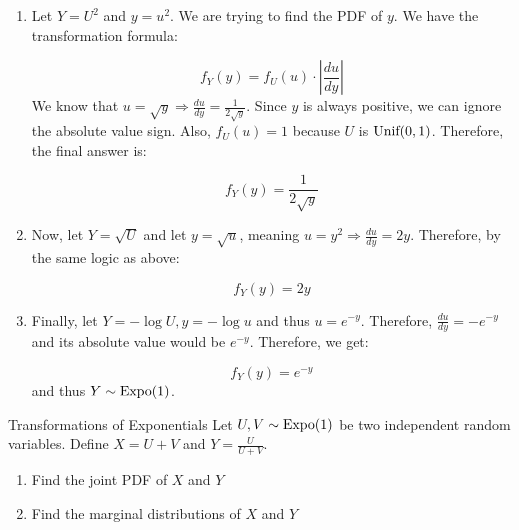 \documentclass[11.5pt]{article}
\begin{document}
\begin{solution}{4}
\begin{enumerate}
\item Let $Y = U^2$ and $y = u^2$. We are trying to find the PDF of $y$. We have the transformation formula: 

$$ f_Y(y) = f_U(u) \cdot \left| \frac{du}{dy}  \right|$$
We know that $u = \sqrt{y} \Rightarrow \frac{du}{dy} = \frac{1}{2 \sqrt{y}}$. Since $y$ is always positive, we can ignore the absolute value sign. Also, $f_U(u) = 1$ because $U$ is $\textrm{Unif}(0,1)$. Therefore, the final answer is: 

$$ f_Y(y) = \frac{1}{2 \sqrt{y}}$$

\item Now, let $Y = \sqrt{U}$ and let $y = \sqrt{u}$, meaning $u= y^2 \Rightarrow \frac{du}{dy} = 2y$. Therefore, by the same logic as above: 

$$ f_Y(y) = 2y$$

\item Finally, let $Y = - \log U, y = - \log u$ and thus $u = e^{-y}$. Therefore, $\frac{du}{dy} = -e^{-y}$ and its absolute value would be $e^{-y}$. Therefore, we get: 

$$ f_Y(y) = e^{-y}$$ and thus $Y \sim \textrm{Expo}(1)$. 
\end{enumerate}



\end{solution}


\begin{exercise}{Transformations of Exponentials}
Let $U, V \sim \textrm{Expo}(1)$ be two independent random variables. Define $X = U + V$ and $Y = \frac{U}{U+V}$. 
\begin{enumerate}
\item Find the joint PDF of $X$ and $Y$ 

\item Find the marginal distributions of $X$ and $Y$ 
\end{enumerate}
\end{exercise}
\end{document}
